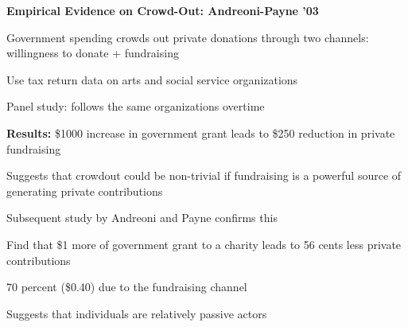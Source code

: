 \documentclass[landscape]{slides}
\begin{document}
\begin{slide}
\begin{center}
{\bf Empirical Evidence on Crowd-Out: Andreoni-Payne '03}
\end{center}

Government spending crowds out private donations through two channels: willingness to donate + fundraising

Use tax return data on arts and social service organizations

Panel study: follows the same organizations overtime
\small

\textbf{Results:} \$1000 increase in government grant leads to \$250 reduction in private fundraising

Suggests that crowdout could be non-trivial if fundraising is a powerful source of generating private contributions

Subsequent study by Andreoni and Payne confirms this

Find that \$1 more of government grant to a charity leads to 56 cents less private contributions

70 percent (\$0.40) due to the fundraising channel

Suggests that individuals are relatively passive actors


\end{slide}


%
%
%
%
%
\end{document}
